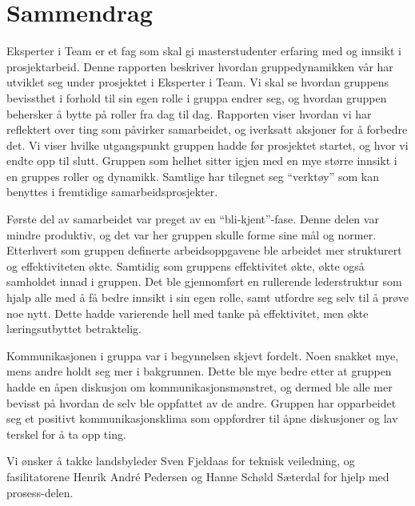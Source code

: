 \chapter*{Sammendrag}
Eksperter i Team er et fag som skal gi masterstudenter erfaring med og innsikt i prosjektarbeid.
Denne rapporten beskriver hvordan gruppedynamikken vår har utviklet seg under prosjektet i Eksperter i Team.
Vi skal se hvordan gruppens bevissthet i forhold til sin egen rolle i gruppa endrer seg, og hvordan gruppen behersker å bytte på roller fra dag til dag.
Rapporten viser hvordan vi har reflektert over ting som påvirker samarbeidet, og iverksatt aksjoner for å forbedre det. 
Vi viser hvilke utgangspunkt gruppen hadde før prosjektet startet, og hvor vi endte opp til slutt. 
Gruppen som helhet sitter igjen med en mye større innsikt i en gruppes roller og dynamikk. 
Samtlige har tilegnet seg ``verktøy'' som kan benyttes i fremtidige samarbeidsprosjekter.
\vspace{\secspace}

Første del av samarbeidet var preget av en ``bli-kjent''-fase.
Denne delen var mindre produktiv, og det var her gruppen skulle forme sine mål og normer. 
Etterhvert som gruppen definerte arbeidsoppgavene ble arbeidet mer strukturert og effektiviteten økte. 
Samtidig som gruppens effektivitet økte, økte også samholdet innad i gruppen. 
Det ble gjennomført en rullerende lederstruktur som hjalp alle med å få bedre innsikt i sin egen rolle, samt utfordre seg selv til å prøve noe nytt. 
Dette hadde varierende hell med tanke på effektivitet, men økte læringsutbyttet betraktelig. 
\vspace{\secspace}

Kommunikasjonen i gruppa var i begynnelsen skjevt fordelt. 
Noen snakket mye, mens andre holdt seg mer i bakgrunnen. 
Dette ble mye bedre etter at gruppen hadde en åpen diskusjon om kommunikasjonsmønstret, og dermed ble alle mer bevisst på hvordan de selv ble oppfattet av de andre. 
Gruppen har opparbeidet seg et positivt kommunikasjonsklima som oppfordrer til åpne diskusjoner og lav terskel for å ta opp ting. 

\vfill
\begin{center}
Vi ønsker å takke landsbyleder Sven Fjeldaas for teknisk veiledning, og fasilitatorene Henrik André Pedersen og Hanne Schøld Sæterdal for hjelp med prosess-delen.
\end{center}
